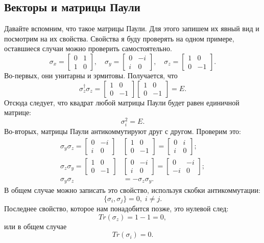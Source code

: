 \subsection{Векторы и матрицы Паули}
Давайте вспомним, что такое матрицы Паули. Для этого запишем их явный вид и
посмотрим на их свойства. Свойства я буду проверять на одном примере,
оставшиеся случаи можно проверить самостоятельно.
\[
  \sigma_x = \begin{bmatrix} 0 & 1 \\ 1 & 0 \end{bmatrix}, \quad \sigma_y = \begin{bmatrix} 0 & -i \\ i & 0 \end{bmatrix}, \quad \sigma_z = \begin{bmatrix} 1 & 0 \\ 0 & -1 \end{bmatrix}.
\]
Во-первых, они унитарны и эрмитовы. Получается, что
\[
  \sigma_z^{\dagger}\sigma_z = \begin{bmatrix} 1 & 0 \\ 0 & -1 \end{bmatrix}\begin{bmatrix} 1 & 0 \\ 0 & -1 \end{bmatrix} = E.
\]
Отсюда следует, что квадрат любой матрицы Паули будет равен единичной матрице:
\[
  \sigma_i^2 = E.
\]
Во-вторых, матрицы Паули антикоммутируют друг с другом. Проверим это:
\begin{align*}
  \sigma_y\sigma_z = \begin{bmatrix} 0 & -i \\ i & 0 \end{bmatrix}&\begin{bmatrix} 1 & 0 \\ 0 & -1 \end{bmatrix} = \begin{bmatrix} 0 & i \\ i & 0 \end{bmatrix};\\
  \sigma_z\sigma_y = \begin{bmatrix} 1 & 0 \\ 0 & -1 \end{bmatrix}&\begin{bmatrix} 0 & -i \\ i & 0 \end{bmatrix} = \begin{bmatrix} 0 & -i \\ -i & 0 \end{bmatrix};\\
  \sigma_y\sigma_z &= -\sigma_z\sigma_y.
\end{align*}
В общем случае можно записать это свойство, используя скобки антикоммутации:
\[
  \{\sigma_i,\sigma_j\} = 0, \; i\neq j.
\]
Последнее свойство, которое нам понадобится позже, это нулевой след:
\[
  Tr(\sigma_z) = 1 - 1 = 0,
\]
или в общем случае
\[
  Tr(\sigma_i) = 0.
\]

